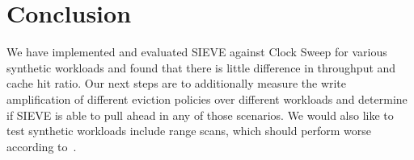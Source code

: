 \documentclass[sigconf]{acmart}
\begin{document}
\section{Conclusion}

We have implemented and evaluated SIEVE against Clock Sweep for various synthetic workloads and found that there is little difference in throughput and cache hit ratio. Our next steps are to additionally measure the write amplification of different eviction policies over different workloads and determine if SIEVE is able to pull ahead in any of those scenarios. We would also like to test synthetic workloads include range scans, which should perform worse according to~\cite{SIEVE}.


{
    
    
} 
\end{document}
